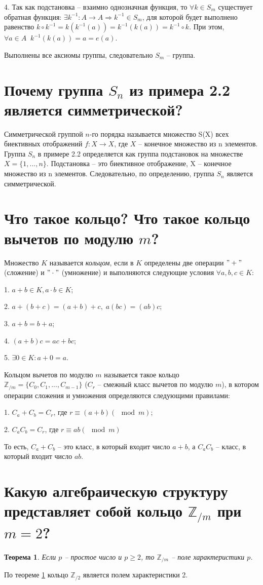 \documentclass[letterpaper,11pt,openany]{book}
\newtheorem{theorem}{Теорема}
\begin{document}
4. Так как подстановка -- взаимно однозначная функция, то $\forall k \in S_m $ существует обратная функция: $\exists k^{-1} \colon A \to A \Rightarrow k^{-1} \in S_m$, для которой будет выполнено равенство $k \circ k^{-1} = k (k^{-1}(a)) = k^{-1} (k(a)) = k^{-1} \circ k$. При этом, $\forall a \in A \;\; k^{-1} (k(a)) = a = e(a)$.

Выполнены все аксиомы группы, следовательно $S_m$ -- группа.

\section{Почему группа $S_n$ из примера 2.2 является симметрической?}
Симметрической группой $n$-го порядка называется множество S(X) всех биективных отображений $f \colon X \to X$, где $X$ -- конечное множество из n элементов.
Группа $S_n$ в примере 2.2 определяется как группа подстановок на множестве $X = \{1,...,n\}$. Подстановка -- это биективное отображение, X -- конечное множество из n элементов. Следовательно, по определению, группа $S_n$ является симметрической.

\section{Что такое кольцо? Что такое кольцо вычетов по модулю $m$?}

Множество $K$ называется \emph{кольцом}, если в $K$ определены две операции $"+"$ (сложение) и $"\cdot"$ (умножение) и выполняются следующие условия $\forall a, b, c \in K$:

1. $a + b \in K, a \cdot b \in K$;

2. $a+(b+c) = (a+b)+c, \; a(bc) = (ab)c$;

3. $a+b = b+a$;

4. $(a+b)c = ac+bc$;

5. $\exists 0 \in K \colon a + 0 = a$.

Кольцом вычетов по модулю $m$ называется такое кольцо $\mathbb{Z}_{/m} = \{C_0, C_1, ..., C_{m-1}\}$ ($C_r$ -- смежный класс вычетов по модулю $m$), в котором операции сложения и умножения определяются следующими правилами:

1. $C_a + C_b = C_r$, \; где $r \equiv (a+b)(\!\!\!\!\mod m)$;

2. $C_a C_b = C_r$, \; где $r \equiv ab(\!\!\!\!\mod m)$

То есть, $C_a + C_b$ -- это класс, в который входит число $a+b$, а $C_a C_b$ -- класс, в который входит число $ab$.

\section{Какую алгебраическую структуру представляет собой кольцо $\mathbb{Z}_{/m}$ при $m = 2$?}

\begin{theorem}
\label{ring_is_field}
Если $p$ -- простое число и $p \ge 2$, то $\mathbb{Z}_{/m}$ -- поле характеристики $p$.
\end{theorem}

По теореме \ref{ring_is_field} кольцо $\mathbb{Z}_{/2}$ является полем характеристики 2.
\end{document}
